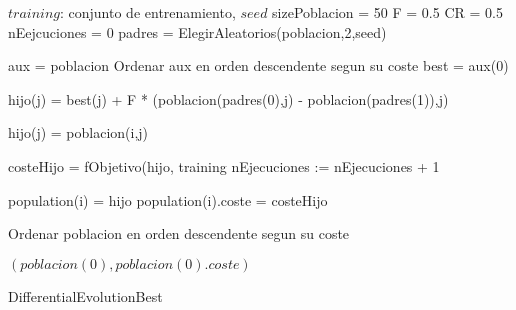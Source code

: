 \documentclass{article}
\begin{document}
\begin{algorithm}
\begin{algorithmic}[1]
	\REQUIRE $training$: conjunto de entrenamiento, $seed$
	\STATE sizePoblacion = 50
	\STATE F = 0.5	
	\STATE CR = 0.5
	\STATE nEejcuciones = 0
	\REPEAT
			\STATE padres = ElegirAleatorios(poblacion,2,seed)
			
			\STATE aux = poblacion
 			\STATE Ordenar aux en orden descendente segun su coste
			\STATE best = aux(0)

					\STATE hijo(j) = best(j) + F * (poblacion(padres(0),j) - poblacion(padres(1)),j)
				
				\ELSE
					\STATE hijo(j) = poblacion(i,j)	
				\ENDIF
			\ENDFOR

			\STATE costeHijo = fObjetivo(hijo, training
			\STATE nEjecuciones := nEjecuciones + 1

				\STATE population(i) = hijo
				\STATE population(i).coste = costeHijo
			\ENDIF
		\ENDFOR
			

 	\STATE Ordenar poblacion en orden descendente segun su coste
	
	\RETURN $(poblacion(0), poblacion(0).coste)$
\end{algorithmic}
\caption{DifferentialEvolutionBest}
\end{algorithm}
\end{document}
